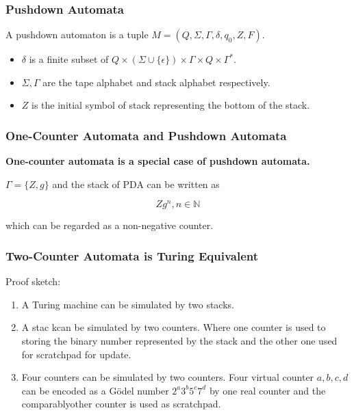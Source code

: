 \documentclass[11pt]{beamer}
\begin{document}
\begin{frame}\frametitle{Pushdown Automata}
\begin{definition}[PDA]
A pushdown automaton is a tuple $M = (Q, \Sigma, \Gamma, \delta, q_0, Z, F)$.
\begin{itemize}
\item $\delta$ is a finite subset of $Q\times (\Sigma \cup \{\epsilon\}) \times \Gamma \times Q \times \Gamma^*$.
\item $\Sigma, \Gamma$ are the tape alphabet and stack alphabet respectively.
\item $Z$ is the initial symbol of stack representing the bottom of the stack.
\end{itemize}

\end{definition}

\end{frame}
\begin{frame}\frametitle{One-Counter Automata and Pushdown Automata}

\textbf{One-counter automata is a special case of pushdown automata.}

$\Gamma = \{Z, g\}$ and the stack of PDA can be written as 

\[Zg^n, n\in \mathbb{N}\]

which can be regarded as a non-negative counter.



\end{frame}


\begin{frame}\frametitle{Two-Counter Automata is Turing Equivalent}
Proof sketch:
\begin{enumerate}
\item A Turing machine can be simulated by two stacks.
\item A stac kcan be simulated by two counters. Where one counter is used to storing the binary number represented by the stack and the other one used for scratchpad for update. 

\item Four counters can be simulated by two counters. Four virtual counter $a,b,c,d$ can be encoded as a G\"odel number $2^a3^b5^c7^d$ by one real counter and the comparablyother counter is used as scratchpad.
\end{enumerate}
\end{frame}
\end{document}
